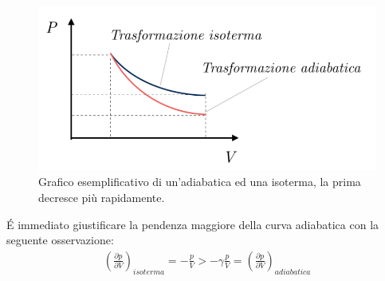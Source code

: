 \documentclass[10pt,a4paper]{article}
\begin{document}
\begin{figure}[h!]
	\centering
	\includegraphics[width=0.6\linewidth]{../images/adiabatica_grafico}
	\caption{Grafico esemplificativo di un'adiabatica ed una isoterma, la prima decresce più rapidamente.}
	\label{fig:adiabaticagrafico}
\end{figure}
\FloatBarrier
\'{E} immediato giustificare la pendenza maggiore della curva adiabatica con la seguente osservazione:
\begin{align*}
	\left(\frac{\partial p}{\partial V}\right)_{isoterma} = -\frac{p}{V} > -\gamma \frac{p}{V} = \left(\frac{\partial p}{\partial V}\right)_{adiabatica}
\end{align*}
\end{document}
